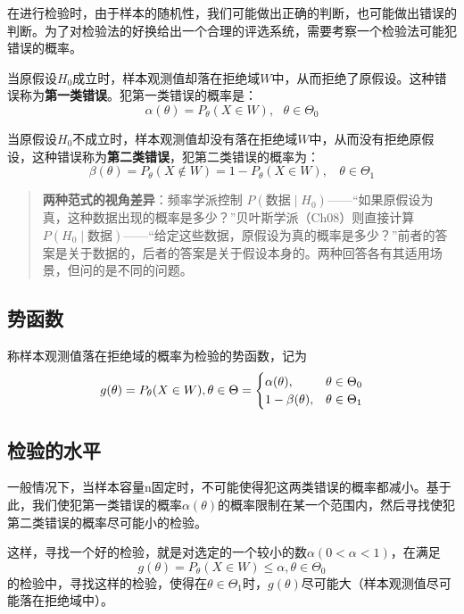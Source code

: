 \documentclass[
]{book}
\begin{document}
在进行检验时，由于样本的随机性，我们可能做出正确的判断，也可能做出错误的判断。为了对检验法的好换给出一个合理的评选系统，需要考察一个检验法可能犯错误的概率。

当原假设\(H_0\)成立时，样本观测值却落在拒绝域\(W\)中，从而拒绝了原假设。这种错误称为\textbf{第一类错误}。犯第一类错误的概率是：
\[
\alpha(\theta)=P_{\theta}(X\in W),\ \ \  \theta\in\Theta_0
\]

当原假设\(H_0\)不成立时，样本观测值却没有落在拒绝域\(W\)中，从而没有拒绝原假设，这种错误称为\textbf{第二类错误}，犯第二类错误的概率为：
\[
\beta(\theta)=P_{\theta}(X\notin W)=1-P_{\theta}(X\in W),\ \ \ \ \theta\in\Theta_1
\]

\begin{quote}
\textbf{两种范式的视角差异}：频率学派控制 \(P(\text{数据} \mid H_0)\)------``如果原假设为真，这种数据出现的概率是多少？''贝叶斯学派（Ch08）则直接计算 \(P(H_0 \mid \text{数据})\)------``给定这些数据，原假设为真的概率是多少？''前者的答案是关于数据的，后者的答案是关于假设本身的。两种回答各有其适用场景，但问的是不同的问题。
\end{quote}

\subsection{势函数}\label{ux52bfux51fdux6570}

称样本观测值落在拒绝域的概率为检验的势函数，记为 \[
g(\theta)=P_{\theta}(X\in W),\theta\in\Theta\\=\begin{cases}
\alpha(\theta),&\theta\in\Theta_0\\
1-\beta(\theta),& \theta\in\Theta_1
\end{cases}
\]

\subsection{检验的水平}\label{ux68c0ux9a8cux7684ux6c34ux5e73}

一般情况下，当样本容量n固定时，不可能使得犯这两类错误的概率都减小。基于此，我们使犯第一类错误的概率\(\alpha(\theta)\)的概率限制在某一个范围内，然后寻找使犯第二类错误的概率尽可能小的检验。

这样，寻找一个好的检验，就是对选定的一个较小的数\(\alpha(0<\alpha<1)\)，在满足
\[
g(\theta)=P_{\theta}(X\in W)\leq\alpha,\theta\in\Theta_0
\]
的检验中，寻找这样的检验，使得在\(\theta\in\Theta_1\)时，\(g(\theta)\)尽可能大（样本观测值尽可能落在拒绝域中）。
\end{document}
